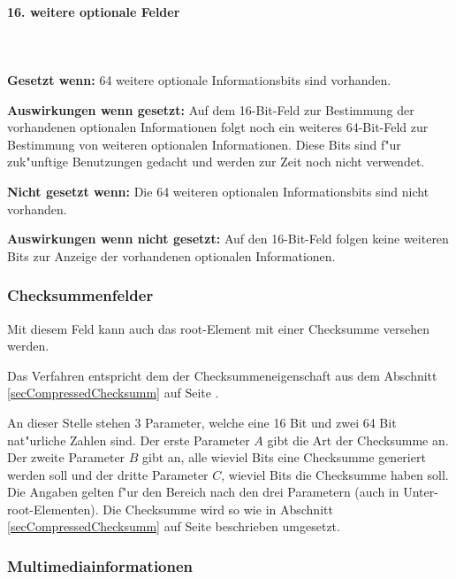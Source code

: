 \paragraph{16. weitere optionale Felder}

\ \\\\\noindent
\textbf{Gesetzt wenn:} 64 weitere optionale Informationsbits sind vorhanden.

\bigskip\noindent
\textbf{Auswirkungen wenn gesetzt:}
Auf dem 16-Bit-Feld zur Bestimmung der vorhandenen optionalen Informationen folgt noch ein weiteres 64-Bit-Feld zur Bestimmung von weiteren optionalen Informationen. Diese Bits sind f"ur zuk"unftige Benutzungen gedacht und werden zur Zeit noch nicht verwendet.

\bigskip\noindent
\textbf{Nicht gesetzt wenn:} Die 64 weiteren optionalen Informationsbits sind nicht vorhanden.

\bigskip\noindent
\textbf{Auswirkungen wenn nicht gesetzt:}
Auf den 16-Bit-Feld folgen keine weiteren Bits zur Anzeige der vorhandenen optionalen Informationen.



\subsubsection{Checksummenfelder}
\label{secCompressedRootChecksumm}

Mit diesem Feld kann auch das root-Element mit einer Checksumme versehen werden.

Das Verfahren entspricht dem der Checksummeneigenschaft aus dem Abschnitt \ref{secCompressedChecksumm} auf Seite \pageref{secCompressedChecksumm}.

An dieser Stelle stehen 3 Parameter, welche eine 16 Bit und zwei 64 Bit nat"urliche Zahlen sind. Der erste Parameter $A$ gibt die Art der Checksumme an. Der zweite Parameter $B$ gibt an, alle wieviel Bits eine Checksumme generiert werden soll und der dritte Parameter $C$, wieviel Bits die Checksumme haben soll. Die Angaben gelten f"ur den Bereich nach den drei Parametern (auch in Unter-root-Elementen). Die Checksumme wird so wie in Abschnitt \ref{secCompressedChecksumm} auf Seite \pageref{secCompressedChecksumm} beschrieben umgesetzt.


\subsubsection{Multimediainformationen}
\label{secCompressedMultimediainfo}

